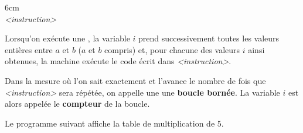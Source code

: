 \begin{center}
\begin{encadre}{6cm}
 \\ \medskip
\hspace*{7mm} {\it <instruction>}
\end{encadre}
\end{center}

\bigskip
Lorsqu'on exécute une \boup, la variable $i$ prend successivement toutes les valeurs entières entre $a$ et $b$ ($a$ et $b$ compris) et, pour chacune des valeurs $i$ ainsi obtenues, la machine exécute le code écrit dans {\it <instruction>}.

\medskip
Dans la mesure où l'on sait exactement et l'avance le nombre de fois que {\it <instruction>} sera répétée, on appelle une \boup une \textbf{boucle bornée}. La variable $i$ est alors appelée le \textbf{compteur} de la boucle.


\medskip
\begin{exemple}
Le programme suivant affiche la table de multiplication de 5.

\begin{center}
\end{center}
\end{exemple}

